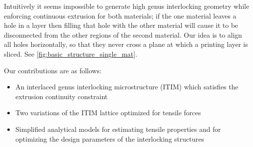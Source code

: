 Intuitively it seems impossible to generate high genus interlocking geometry while enforcing continuous extrusion for both materials;
if the one material leaves a hole in a layer then filling that hole with the other material will cause it to be disconnected from the other regions of the second material.
Our idea is to align all holes horizontally, so that they never cross a plane at which a printing layer is sliced.
See \cref{fig:basic_structure_single_mat}.


Our contributions are as follows:
\begin{itemize}
	\item An interlaced genus interlocking microstructure (ITIM) which satisfies the extrusion continuity constraint
	\item Two variations of the ITIM lattice optimized for tensile forces
	\item Simplified analytical models for estimating tensile properties and for optimizing the design parameters of the interlocking structures
\end{itemize}










